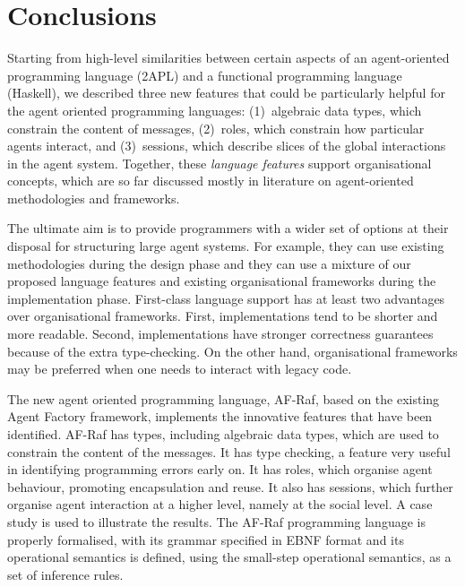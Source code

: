 \documentclass[a4paper,12pt,oneside,fleqn]{book} %
\newcommand{\todo}[1]{[\textcolor{red}{TODO}: #1]}
\begin{document}
{%

\chapter{Conclusions}\label{ch:conc} %


Starting from high-level similarities between certain aspects of an
agent-oriented programming language (2APL) and a functional programming
language (Haskell), we described three new features that could be
particularly helpful for the agent oriented programming languages:
(1)~algebraic data types, which constrain the content of messages,
(2)~roles, which constrain how particular agents interact, and
(3)~sessions, which describe slices of the global interactions in the agent
system. Together, these \emph{language features} support organisational
concepts, which are so far discussed mostly in literature on
agent-oriented methodologies and frameworks.

The ultimate aim is to provide programmers with a wider set of options at
their disposal for structuring large agent systems. For example, they can
use existing methodologies during the design phase and they can use a
mixture of our proposed language features and existing organisational
frameworks during the implementation phase. First-class language support
has at least two advantages over organisational frameworks. First,
implementations tend to be shorter and more readable. Second,
implementations have stronger correctness guarantees because of the extra
type-checking. On the other hand, organisational frameworks may be
preferred when one needs to interact with legacy code.

The new agent oriented programming language, AF-Raf, based on the existing
Agent Factory framework, implements the innovative features that have been
identified. AF-Raf has types, including algebraic data types, which are
used to constrain the content of the messages. It has type checking, a
feature very useful in identifying programming errors early on. It has
roles, which organise agent behaviour, promoting encapsulation and reuse.
It also has sessions, which further organise agent interaction at a higher
level, namely at the social level. A case study is used to illustrate the
results. The AF-Raf programming language is properly formalised, with its
grammar specified in EBNF format and its operational semantics is defined,
using the small-step operational semantics, as a set of inference rules.

}
\end{document}
